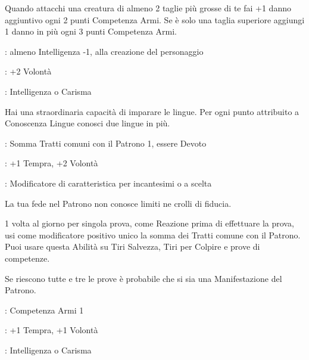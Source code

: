 \begin{multicols}{2}
Quando attacchi una creatura di almeno 2 taglie più grosse di te fai +1 danno aggiuntivo ogni 2 punti Competenza Armi. Se è solo una taglia superiore aggiungi 1 danno in più ogni 3 punti Competenza Armi.

\begin{description}[noitemsep, topsep=0pt, parsep=0pt, partopsep=0pt, leftmargin=0cm, labelwidth=2.5cm]
    \item[\textbf{Requisito}]: almeno Intelligenza -1, alla creazione del personaggio
    \item[\textbf{Tiri Salvezza}]: +2 Volontà
    \item[\textbf{Caratteristica}]: Intelligenza o Carisma
\end{description}

Hai una straordinaria capacità di imparare le lingue. Per ogni punto attribuito a Conoscenza Lingue conosci due lingue in più.

\begin{description}[noitemsep, topsep=0pt, parsep=0pt, partopsep=0pt, leftmargin=0cm, labelwidth=2.5cm]
    \item[\textbf{Requisito}]: Somma Tratti comuni con il Patrono 1, essere Devoto
    \item[\textbf{Tiri Salvezza}]: +1 Tempra, +2 Volontà
    \item[\textbf{Caratteristica}]: Modificatore di caratteristica per incantesimi o a scelta
\end{description}

La tua fede nel Patrono non conosce limiti ne crolli di fiducia.

1 volta al giorno per singola prova, come Reazione prima di effettuare la prova, usi come modificatore positivo unico la somma dei Tratti comune con il Patrono. Puoi usare questa Abilità su Tiri Salvezza, Tiri per Colpire e prove di competenze.

Se riescono tutte e tre le prove è probabile che si sia una Manifestazione del Patrono.

\begin{description}[noitemsep, topsep=0pt, parsep=0pt, partopsep=0pt, leftmargin=0cm, labelwidth=2.5cm]
    \item[\textbf{Requisito}]: Competenza Armi 1
    \item[\textbf{Tiri Salvezza}]: +1 Tempra, +1 Volontà
    \item[\textbf{Caratteristica}]: Intelligenza o Carisma
\end{description}


\end{multicols}
